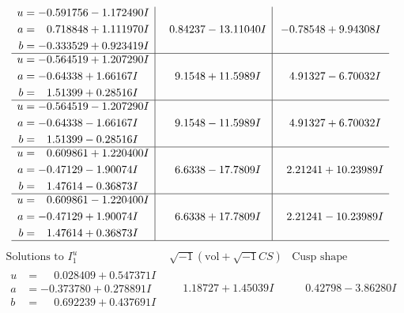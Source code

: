 \documentclass[1p]{elsarticle_modified}
\theoremstyle{definition}
\newcommand{\I}{\sqrt{-1}}
\begin{document}
$$\begin{array}{c|c|c}
\begin{aligned}
u &= -0.591756 - 1.172490 I \\
a &= \phantom{-}0.718848 + 1.111970 I \\
b &= -0.333529 + 0.923419 I\end{aligned}
 & \phantom{-}0.84237 - 13.11040 I & -0.78548 + 9.94308 I \\ \hline\begin{aligned}
u &= -0.564519 + 1.207290 I \\
a &= -0.64338 + 1.66167 I \\
b &= \phantom{-}1.51399 + 0.28516 I\end{aligned}
 & \phantom{-}9.1548 + 11.5989 I & \phantom{-}4.91327 - 6.70032 I \\ \hline\begin{aligned}
u &= -0.564519 - 1.207290 I \\
a &= -0.64338 - 1.66167 I \\
b &= \phantom{-}1.51399 - 0.28516 I\end{aligned}
 & \phantom{-}9.1548 - 11.5989 I & \phantom{-}4.91327 + 6.70032 I \\ \hline\begin{aligned}
u &= \phantom{-}0.609861 + 1.220400 I \\
a &= -0.47129 - 1.90074 I \\
b &= \phantom{-}1.47614 - 0.36873 I\end{aligned}
 & \phantom{-}6.6338 - 17.7809 I & \phantom{-}2.21241 + 10.23989 I \\ \hline\begin{aligned}
u &= \phantom{-}0.609861 - 1.220400 I \\
a &= -0.47129 + 1.90074 I \\
b &= \phantom{-}1.47614 + 0.36873 I\end{aligned}
 & \phantom{-}6.6338 + 17.7809 I & \phantom{-}2.21241 - 10.23989 I\\
 \hline 
 \end{array}$$\newpage$$\begin{array}{c|c|c}  
\text{Solutions to }I^u_{1}& \I (\text{vol} + \sqrt{-1}CS) & \text{Cusp shape}\\
 \hline 
\begin{aligned}
u &= \phantom{-}0.028409 + 0.547371 I \\
a &= -0.373780 + 0.278891 I \\
b &= \phantom{-}0.692239 + 0.437691 I\end{aligned}
 & \phantom{-}1.18727 + 1.45039 I & \phantom{-}0.42798 - 3.86280 I \\ \hline\begin{aligned}

\end{aligned}
\end{array}$$
\end{document}
